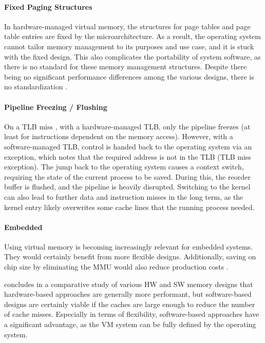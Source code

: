 \paragraph{Fixed Paging Structures} In hardware-managed virtual memory, the structures for page tables
and page table entries are fixed by the microarchitecture. As a result, the operating system cannot tailor
memory management to its purposes and use case, and it is stuck with the fixed design.
This also complicates the portability of system software, as there is no standard for these memory management
structures. Despite there being no significant performance differences among the various designs,
there is no standardization \cite{jacob1998look}.

\paragraph{Pipeline Freezing / Flushing} On a TLB miss ,
with a hardware-managed TLB, only the pipeline freezes (at least for instructions dependent on
the memory access). However, with a software-managed TLB, control is handed back to the operating system
via an exception, which notes that the required address is not in the TLB (TLB miss exception).
The jump back to the operating system causes a context switch, requiring the state of the current process
to be saved. During this, the reorder buffer is flushed, and the pipeline is heavily disrupted.
Switching to the kernel can also lead to further data and instruction misses in the long term,
as the kernel entry likely overwrites some cache lines that the running process needed. 

\paragraph{Embedded} Using virtual memory is becoming increasingly relevant for embedded systems.
They would certainly benefit from more flexible designs. Additionally, saving on chip size by
eliminating the MMU would also reduce production costs \cite{jacob1998look}. 



\cite{jacob1998look} concludes in a comparative study of various HW and SW memory designs
that hardware-based approaches are generally more performant, but software-based designs are certainly
viable if the caches are large enough to reduce the number of cache misses.
Especially in terms of flexibility, software-based approaches have a significant advantage,
as the VM system can be fully defined by the operating system.

